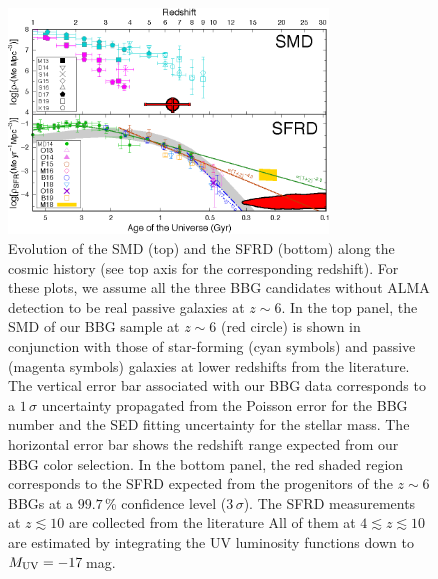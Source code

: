 \begin{figure}
\begin{center}
\includegraphics[width=8.5cm]{astrodiv/cos/Mawatari2020_Fig13.eps} 
\end{center}
\vspace{-5mm}
\caption{
Evolution of the SMD (top) and the SFRD (bottom) along the cosmic history (see top axis for the corresponding redshift). 
For these plots, we assume all the three BBG candidates without ALMA detection to be real passive galaxies at $z \sim 6$. 
In the top panel, the SMD of our BBG sample at $z \sim 6$ (red circle) is shown 
in conjunction with those of star-forming (cyan symbols) and passive (magenta symbols) galaxies at lower redshifts 
from the literature. 
The vertical error bar associated with our BBG data corresponds to a $1\,\sigma$ uncertainty 
propagated from the Poisson error 
for the BBG number and the SED fitting uncertainty for the stellar mass. 
The horizontal error bar shows the redshift range expected from our BBG color selection. 
In the bottom panel, the red shaded region corresponds to the SFRD 
expected from the progenitors of the $z \sim 6$ BBGs at a $99.7$\,\% confidence level ($3\,\sigma$). 
The SFRD measurements at $z \lesssim 10$ are collected from the literature 
All of them at $4 \lesssim z \lesssim 10$ are estimated by integrating the UV 
luminosity functions 
down to $M_{\rm UV} = -17$\,mag. 
}
\end{figure}
